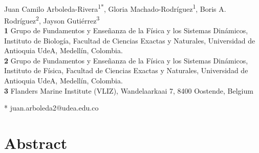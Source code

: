 \documentclass[10pt,letterpaper]{article}
\date{}
\begin{document}
\vspace*{0.2in}

\begin{flushleft}
{\Large
\textbf{}
}
\newline
\\
Juan Camilo Arboleda-Rivera\textsuperscript{1*},
Gloria Machado-Rodríguez\textsuperscript{1},
Boris A. Rodríguez\textsuperscript{2},
Jayson Gutiérrez\textsuperscript{3}
\\
\bigskip
\textbf{1} Grupo de Fundamentos y Enseñanza de la Física y los Sistemas Dinámicos,
Instituto de Biología, Facultad de Ciencias Exactas y Naturales, Universidad de Antioquia
UdeA, Medellín, Colombia.
\\
\textbf{2} Grupo de Fundamentos y Enseñanza de la Física y los Sistemas Dinámicos,
Instituto de Física, Facultad de Ciencias Exactas y Naturales, Universidad de Antioquia
UdeA, Medellín, Colombia.
\\
\textbf{3} Flanders Marine Institute (VLIZ), Wandelaarkaai 7, 8400 Oostende,
Belgium
\\
\bigskip

* juan.arboleda2@udea.edu.co

\end{flushleft}
\section*{Abstract}
\end{document}
